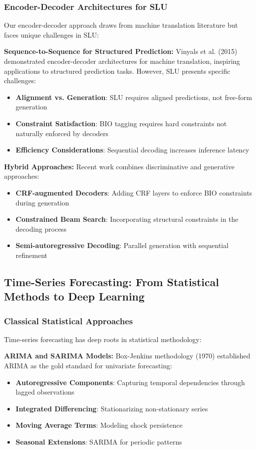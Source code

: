 \documentclass[conference]{IEEEtran}
\begin{document}
\subsubsection{Encoder-Decoder Architectures for SLU}
Our encoder-decoder approach draws from machine translation literature but faces unique challenges in SLU:

\textbf{Sequence-to-Sequence for Structured Prediction:}
Vinyals et al. (2015) demonstrated encoder-decoder architectures for machine translation, inspiring applications to structured prediction tasks. However, SLU presents specific challenges:
\begin{itemize}
  \item \textbf{Alignment vs. Generation}: SLU requires aligned predictions, not free-form generation
  \item \textbf{Constraint Satisfaction}: BIO tagging requires hard constraints not naturally enforced by decoders
  \item \textbf{Efficiency Considerations}: Sequential decoding increases inference latency
\end{itemize}

\textbf{Hybrid Approaches:}
Recent work combines discriminative and generative approaches:
\begin{itemize}
  \item \textbf{CRF-augmented Decoders}: Adding CRF layers to enforce BIO constraints during generation
  \item \textbf{Constrained Beam Search}: Incorporating structural constraints in the decoding process
  \item \textbf{Semi-autoregressive Decoding}: Parallel generation with sequential refinement
\end{itemize}

\subsection{Time-Series Forecasting: From Statistical Methods to Deep Learning}

\subsubsection{Classical Statistical Approaches}
Time-series forecasting has deep roots in statistical methodology:

\textbf{ARIMA and SARIMA Models:}
Box-Jenkins methodology (1970) established ARIMA as the gold standard for univariate forecasting:
\begin{itemize}
  \item \textbf{Autoregressive Components}: Capturing temporal dependencies through lagged observations
  \item \textbf{Integrated Differencing}: Stationarizing non-stationary series
  \item \textbf{Moving Average Terms}: Modeling shock persistence
  \item \textbf{Seasonal Extensions}: SARIMA for periodic patterns
\end{itemize}
\end{document}
